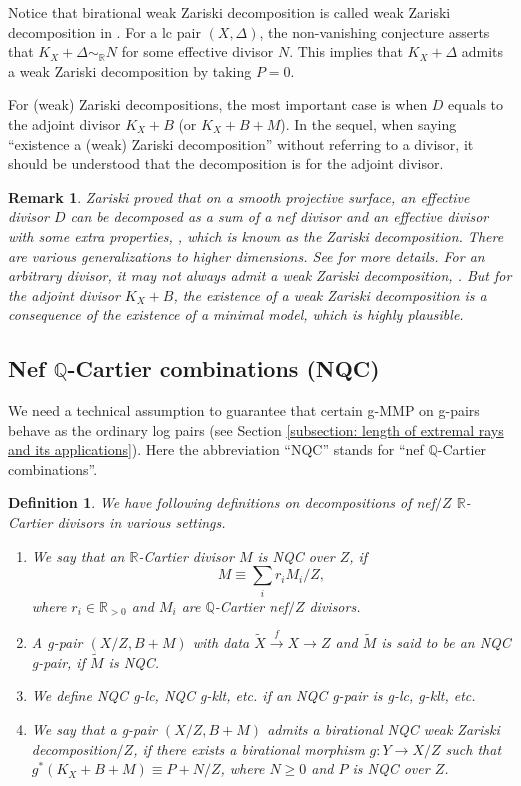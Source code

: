 \documentclass[11pt]{amsart}
\newcommand{\Rr}{\mathbb{R}}
\newcommand{\Qq}{\mathbb{Q}}
\newtheorem{definition}[theorem]{Definition}
\newtheorem{remark}[theorem]{Remark}
\begin{document}
Notice that birational weak Zariski decomposition is called weak Zariski decomposition in \cite[Definition 1.3]{Birkarweak12}. For a lc pair $(X, \Delta)$, the non-vanishing conjecture asserts that $K_X+\Delta \sim_\Rr N$ for some effective divisor $N$. This implies that  $K_X+\Delta$ admits a weak Zariski decomposition by taking $P=0$.

For (weak) Zariski decompositions, the most important case is when $D$ equals to the adjoint divisor $K_X+B$ (or $K_X+B+M$). In the sequel, when saying ``existence a (weak) Zariski decomposition'' without referring to a divisor, it should be understood that the decomposition is for the adjoint divisor.


\begin{remark}
	Zariski proved that on a smooth projective surface, an effective divisor $D$ can be decomposed as a sum of a nef divisor and an effective divisor with some extra properties, \cite{Zariski62}, which is known as the Zariski decomposition. There are various generalizations to higher dimensions. See \cite{Nakayamazariski} for more details. For an arbitrary divisor, it may not always admit a weak Zariski decomposition, \cite{John14}. But for the adjoint divisor $K_X+B$, the existence of a weak Zariski decomposition is a consequence of the existence of a minimal model, which is highly plausible. 
\end{remark}


\subsection{Nef $\Qq$-Cartier combinations (NQC)}\label{sec: NQC}

We need a technical assumption to guarantee that certain g-MMP on g-pairs behave as the ordinary log pairs (see Section \ref{subsection: length of extremal rays and its applications}). Here the abbreviation ``NQC'' stands for ``nef $\Qq$-Cartier combinations''. 

\begin{definition}\label{def: NQC} 
	We have following definitions on decompositions of nef$/Z$ $\Rr$-Cartier divisors in various settings. 
	\begin{enumerate}
		\item We say that an $\Rr$-Cartier divisor $M$ is \emph{NQC} over $Z$, if
		\[
		M\equiv\sum_i r_i M_i/Z,
		\] where $r_i \in \Rr_{>0}$ and $M_i$ are $\Qq$-Cartier nef$/Z$ divisors. 
		\item A g-pair $(X/Z, B+M)$ with data $\tilde X \xrightarrow{f}X \to Z$ and $\tilde M$ is said to be an \emph{NQC g-pair}, if $\tilde M$ is NQC. 
		\item We define \emph{NQC g-lc, NQC g-klt}, etc. if an NQC g-pair is g-lc, g-klt, etc.
		\item We say that a g-pair $(X/Z, B+M)$ admits a \emph{birational NQC weak Zariski decomposition$/Z$}, if there exists a birational morphism $g: Y \to X/Z$ such that $g^*(K_X+B+M)\equiv P+N/Z$, where $N \geq 0$ and $P$ is NQC over $Z$.
	\end{enumerate}
\end{definition} 
\end{document}
